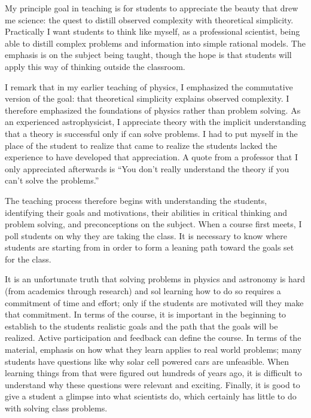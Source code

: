 \documentclass{article}
\begin{document}
My principle goal in teaching is for students to appreciate the beauty that drew me science: the quest to
distill  observed complexity with
theoretical simplicity.  Practically I want students to think like
myself, as a professional scientist, being able to distill complex problems and information into simple rational
models.  The emphasis is on the subject being taught, though the hope is that students will apply this way of thinking
outside the classroom.

I remark that in  my earlier teaching of physics,  I emphasized the commutative version
of the goal: that theoretical simplicity explains observed complexity.  I therefore emphasized the foundations of physics
rather than problem solving. As an experienced astrophysicist, I
appreciate theory with the implicit understanding that a theory is successful only if can solve problems.
I had to put myself in the place of the student to realize that came to realize the students lacked the experience
to have developed that appreciation.  A quote from a professor that I only appreciated afterwards is
``You don't really understand the theory if you can't solve the problems.''


The teaching process therefore begins with understanding the students, identifying their goals and motivations, their abilities in critical thinking and
problem solving, and preconceptions on the subject.  When a course first meets, I poll students on why they are taking the
class.  It is necessary to know where students are starting from in order to form a leaning path toward the goals
set for the class. 

It is an unfortunate truth that solving problems in physics and astronomy is hard (from academics
through research) and sol learning how to do so requires a commitment of time and effort;
only if the students are motivated will they make that commitment.  In terms of the course,
it is important in the beginning to establish  to the students realistic goals and the path that the goals will be realized.
Active participation and feedback can define the course.
In terms of the material, emphasis on how what they learn applies to real world problems; many students have
questions 
like why solar cell powered cars are unfeasible.  When learning things from that were figured out
hundreds of years ago, it is difficult to understand why these questions were relevant and exciting.
Finally, it is good to give a student a glimpse into what scientists do, which certainly has little to do with solving
class problems.
\end{document}

